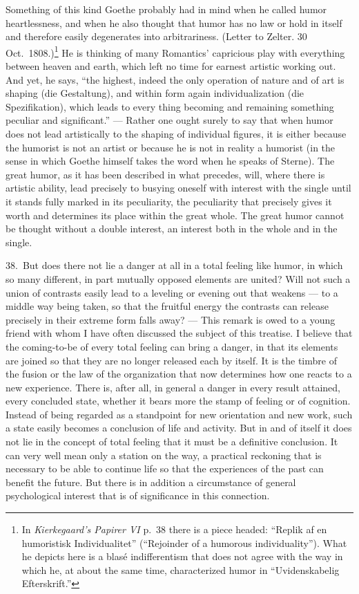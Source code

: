 \documentclass[12pt]{book}
\newcommand{\opage}[1]{\marginnote{\footnotesize\textit{[#1]}}}
\begin{document}
Something of this kind Goethe probably had in mind when he called humor heartlessness, and
when he also thought that humor has no law or hold in itself and therefore easily degenerates
into arbitrariness. (Letter to Zelter. 30 Oct.\ 1808.)\footnote{In \textit{Kierkegaard's
Papirer VI} p.~38 there is a piece headed: ``Replik af en humoristisk Individualitet''
(``Rejoinder of a humorous individuality''). What he depicts here is a blasé indifferentism
that does not agree with the way in which he, at about the same time, characterized humor in
``Uvidenskabelig Efterskrift.''} He is thinking of many Romantics' capricious play with
everything between heaven and earth, which left no time for earnest artistic working out.
And yet, he says, ``the highest, indeed the only operation of nature and of art is shaping
(die Gestaltung), and within form again individualization (die Spezifikation), which leads
to every thing becoming and remaining something peculiar and significant.'' --- Rather one
ought surely to say that when humor does not lead artistically to the shaping of individual
figures, it is either because the humorist is not an artist or because he is not in reality
a humorist (in the sense in which Goethe himself takes the word when he speaks of Sterne).
The great humor, as it has been described in what precedes, will, where there is artistic
ability, lead precisely to busying oneself with interest with the single until it stands
fully marked in its peculiarity, the peculiarity that precisely gives it worth and determines
its place within the great whole. The great humor cannot be thought without a double
interest, an interest both in the whole and in the single.

38.~But does there not lie a danger at all in a total feeling like humor, in which so many
different, in part mutually \opage{128}opposed elements are united? Will not such a union of
contrasts easily lead to a leveling or evening out that weakens --- to a middle way being
taken, so that the fruitful energy the contrasts can release precisely in their extreme form
falls away? --- This remark is owed to a young friend with whom I have often discussed the
subject of this treatise. I believe that the coming-to-be of every total feeling can bring a
danger, in that its elements are joined so that they are no longer released each by itself.
It is the timbre of the fusion or the law of the organization that now determines how one
reacts to a new experience. There is, after all, in general a danger in every result
attained, every concluded state, whether it bears more the stamp of feeling or of cognition.
Instead of being regarded as a standpoint for new orientation and new work, such a state
easily becomes a conclusion of life and activity. But in and of itself it does not lie in
the concept of total feeling that it must be a definitive conclusion. It can very well mean
only a station on the way, a practical reckoning that is necessary to be able to continue
life so that the experiences of the past can benefit the future. But there is in addition a
circumstance of general psychological interest that is of significance in this connection.
\end{document}
